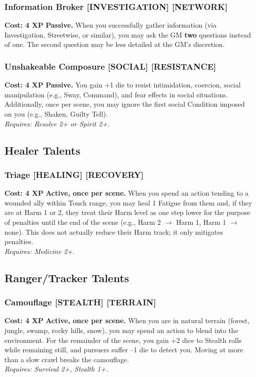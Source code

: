 \subsubsection*{Information Broker \textnormal{[INVESTIGATION] [NETWORK]}}
\label{talent:information-broker}
\textbf{Cost: 4 XP} \textbf{Passive.} When you successfully gather information (via Investigation, Streetwise, or similar), you may ask the GM \textbf{two} questions instead of one. The second question may be less detailed at the GM's discretion.

\subsubsection*{Unshakeable Composure \textnormal{[SOCIAL] [RESISTANCE]}}
\label{talent:unshakeable-composure}
\textbf{Cost: 4 XP} \textbf{Passive.} You gain +1 die to resist intimidation, coercion, social manipulation (e.g., Sway, Command), and fear effects in social situations. Additionally, once per scene, you may ignore the first social Condition imposed on you (e.g., Shaken, Guilty Tell). \\
\textit{Requires: Resolve 2+ or Spirit 2+.}

\subsection*{Healer Talents}
\label{sec:major-healer}

\subsubsection*{Triage \textnormal{[HEALING] [RECOVERY]}}
\label{talent:triage}
\textbf{Cost: 4 XP} \textbf{Active, once per scene.} When you spend an action tending to a wounded ally within Touch range, you may heal 1 Fatigue from them and, if they are at Harm 1 or 2, they treat their Harm level as one step lower for the purpose of penalties until the end of the scene (e.g., Harm 2 $\rightarrow$ Harm 1, Harm 1 $\rightarrow$ none). This does not actually reduce their Harm track; it only mitigates penalties. \\
\textit{Requires: Medicine 2+.}

\subsection*{Ranger/Tracker Talents}
\label{sec:major-ranger}

\subsubsection*{Camouflage \textnormal{[STEALTH] [TERRAIN]}}
\label{talent:camouflage}
\textbf{Cost: 4 XP} \textbf{Active, once per scene.} When you are in natural terrain (forest, jungle, swamp, rocky hills, snow), you may spend an action to blend into the environment. For the remainder of the scene, you gain +2 dice to Stealth rolls while remaining still, and pursuers suffer --1 die to detect you. Moving at more than a slow crawl breaks the camouflage. \\
\textit{Requires: Survival 2+, Stealth 1+.}

